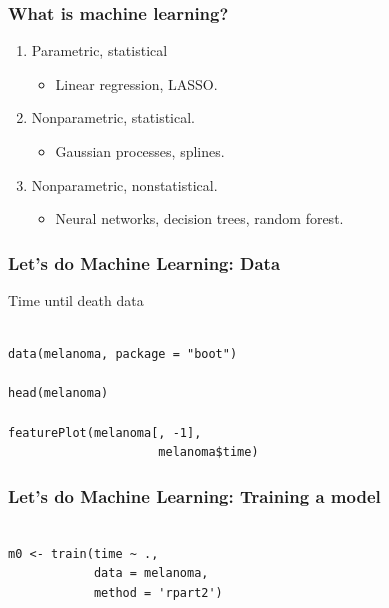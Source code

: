 \documentclass[handout, aspectratio = 169]{beamer}
\begin{document}
\begin{frame}
\frametitle{What is machine learning?}
\begin{enumerate}
\item Parametric, statistical 
\begin{itemize}
\item Linear regression, LASSO.
\end{itemize}

\item Nonparametric, statistical.
\begin{itemize}
\item Gaussian processes, splines.
\end{itemize}
\item Nonparametric, nonstatistical.
\begin{itemize}
\item Neural networks, decision trees, random forest.
\end{itemize}
\end{enumerate}
\end{frame} 

\begin{frame}[fragile]
\frametitle{Let's do Machine Learning: Data}
Time until death data
\begin{Verbatim}

data(melanoma, package = "boot")

head(melanoma)

featurePlot(melanoma[, -1], 
                     melanoma$time)

\end{Verbatim}

\end{frame} 

\begin{frame}[fragile]
\frametitle{ Let's do Machine Learning: Training a model}
\begin{Verbatim}

m0 <- train(time ~ ., 
            data = melanoma,
            method = 'rpart2')

\end{Verbatim}

\end{frame} 
\end{document}
